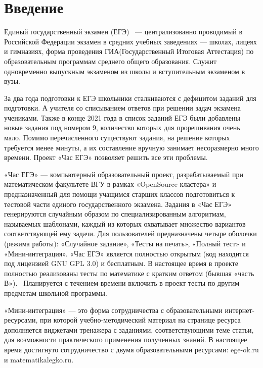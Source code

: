 
\section*{Введение}
Единый государственный экзамен (ЕГЭ)~ — централизованно проводимый в Российской
Федерации экзамен в средних учебных заведениях — школах, лицеях и гимназиях,
форма проведения ГИА(Государственный Итоговая Аттестация) по образовательным программам среднего общего образования.
Служит одновременно выпускным экзаменом из школы и вступительным экзаменом в вузы.

За два года подготовки к ЕГЭ школьники сталкиваются с дефицитом заданий для подготовки.
А учителя со списыванием ответов при решении задач экзамена учениками.
Также в конце 2021 года в список заданий ЕГЭ были добавлены новые задания под номером 9,
количество которых для прорешивания очень мало. Помимо перечисленного существуют задания, на решение которых требуется менее минуты, а их составление вручную занимает несоразмерно много времени.
Проект «Час ЕГЭ» позволяет решить все эти проблемы.

«Час ЕГЭ» — компьютерный образовательный проект, разрабатываемый при математическом
факультете ВГУ в рамках «OpenSource кластера» и предназначенный для помощи учащимся
старших классов подготовиться к тестовой части единого государственного экзамена.
Задания в «Час ЕГЭ» генерируются случайным образом по специализированным алгоритмам,
называемых шаблонами, каждый из которых
охватывает множество вариантов соответствующей ему задачи. Для
пользователей
предназначены четыре оболочки (режима работы): «Случайное задание», «Тесты на печать»,
«Полный тест» и «Мини-интеграция».
«Час ЕГЭ» является полностью открытым (код находится под лицензией GNU GPL 3.0)
и бесплатным.
В настоящее время в проекте полностью реализованы тесты по математике с кратким
ответом (бывшая «часть В»).~\cite{fipi}
Планируется с течением времени включить в проект тесты по другим предметам школьной
программы.

«Мини-интеграция» — это форма сотрудничества с образовательными интернет-ресурсами,
при которой учебно-методический материал на странице ресурса дополняется виджетами
тренажера с заданиями, соответствующими теме статьи, для возможности практического
применения полученных знаний.
В настоящее время достигнуто сотрудничество с двумя образовательными ресурсами: ege-ok.ru
и matematikalegko.ru.
